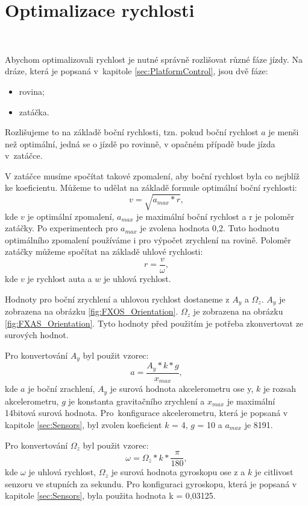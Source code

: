 \chapter{Optimalizace rychlosti}
\label{sec:SpeedOptimization}
\

Abychom optimalizovali rychlost je nutné správně rozlišovat různé fáze jízdy. Na
dráze, která je popsaná v~kapitole \ref{sec:PlatformControl}, jsou dvě fáze:
\begin{itemize}
	\item{rovina;}
	\item{zatáčka.}
\end{itemize}

Rozlišujeme to na základě boční rychlosti, tzn. pokud boční rychlost $a$ je menši než
optimální, jedná se o jízdě po rovinně, v opačném případě bude jízda v~zatáčce.

V zatáčce musíme spočítat takové zpomalení, aby boční rychlost byla
co nejblíž ke koeficientu. Můžeme to udělat na základě formule optimální boční
rychlosti:
\begin{equation}
v = \sqrt{a_{max} * r},
\end{equation}
kde $v$ je optimální zpomalení, $a_{max}$ je maximální boční rychlost a r je poloměr
zatáčky. Po experimentech pro $a_{max}$ je zvolena hodnota 0,2. Tuto hodnotu
optimálního zpomalení používáme i pro výpočet zrychlení na rovině. Poloměr zatáčky můžeme
spočítat na základě uhlové rychlosti:
\begin{equation}
r = \frac{v}{\omega},
\end{equation}
kde $v$ je rychlost auta a $w$ je uhlová rychlost.

Hodnoty pro boční zrychlení a uhlovou rychlost dostaneme z $A_y$ a $\Omega_z$. $A_y$ je 
zobrazena na obrázku \ref{fig:FXOS_Orientation}. $\Omega_z$ je zobrazena na obrázku
\ref{fig:FXAS_Orientation}.
Tyto hodnoty před použitím je potřeba zkonvertovat ze surových
hodnot.

Pro konvertování $A_y$ byl použit vzorec:
\begin{equation}
a = \frac{A_y * k * g}{x_{max}},
\end{equation}
kde $a$ je boční zrachlení, $A_y$ je surová hodnota akcelerometru ose y, 
$k$ je rozsah akcelerometru,  $g$ je konstanta gravitačního zrychlení a $x_{max}$ je  
maximální 14bitová surová hodnota.  Pro~konfigurace akcelerometru, která je popsaná v kapitole
\ref{sec:Sensors}, byl zvolen koeficient $k$ = 4, $g$ = 10 a $a_{max}$ je 8191.

Pro konvertování $\Omega_z$ byl použit vzorec:
\begin{equation}
\omega = \Omega_z * k * \frac{\pi}{180},
\end{equation}
kde $\omega$ je uhlová rychlost, $\Omega_z$ je surová hodnota gyroskopu ose z 
a $k$ je citlivost senzoru ve stupních za sekundu.
Pro konfiguraci gyroskopu, která je popsaná v kapitole
\ref{sec:Sensors}, byla použita hodnota k = 0,03125.

\endinput
